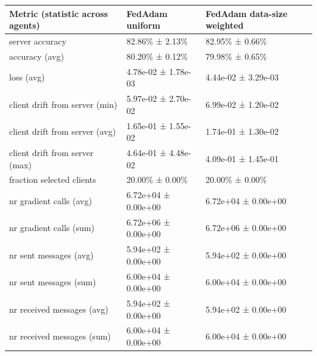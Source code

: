 \begin{tabular}{lll}
\hline
 Metric (statistic across agents)   & FedAdam uniform     & FedAdam data-size weighted   \\
\hline
 server accuracy                    & 82.86\% ± 2.13\%      & 82.95\% ± 0.66\%               \\
 accuracy (avg)                     & 80.20\% ± 0.12\%      & 79.98\% ± 0.65\%               \\
 loss (avg)                         & 4.78e-02 ± 1.78e-03 & 4.44e-02 ± 3.29e-03          \\
 client drift from server (min)     & 5.97e-02 ± 2.70e-02 & 6.99e-02 ± 1.20e-02          \\
 client drift from server (avg)     & 1.65e-01 ± 1.55e-02 & 1.74e-01 ± 1.30e-02          \\
 client drift from server (max)     & 4.64e-01 ± 4.48e-02 & 4.09e-01 ± 1.45e-01          \\
 fraction selected clients          & 20.00\% ± 0.00\%      & 20.00\% ± 0.00\%               \\
 nr gradient calls (avg)            & 6.72e+04 ± 0.00e+00 & 6.72e+04 ± 0.00e+00          \\
 nr gradient calls (sum)            & 6.72e+06 ± 0.00e+00 & 6.72e+06 ± 0.00e+00          \\
 nr sent messages (avg)             & 5.94e+02 ± 0.00e+00 & 5.94e+02 ± 0.00e+00          \\
 nr sent messages (sum)             & 6.00e+04 ± 0.00e+00 & 6.00e+04 ± 0.00e+00          \\
 nr received messages (avg)         & 5.94e+02 ± 0.00e+00 & 5.94e+02 ± 0.00e+00          \\
 nr received messages (sum)         & 6.00e+04 ± 0.00e+00 & 6.00e+04 ± 0.00e+00          \\
\hline
\end{tabular}